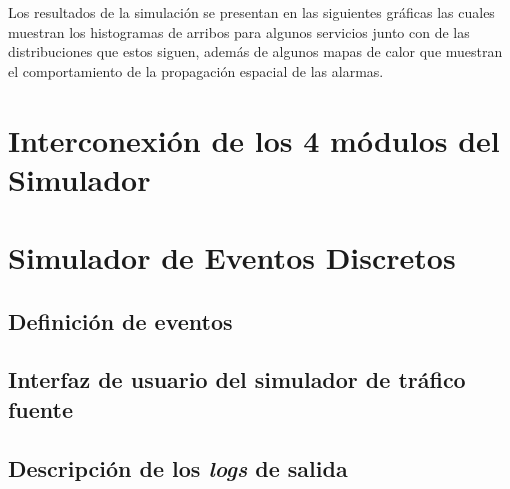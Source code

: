 Los resultados de la simulación se presentan en las siguientes gráficas las cuales muestran los histogramas de arribos para algunos servicios junto con de las distribuciones que estos siguen, además de algunos mapas de calor que muestran el comportamiento de la propagación espacial de las alarmas. \newline


\hfill

\break


\section{Interconexión de los 4 módulos del Simulador}


\hfill

\break


\section{Simulador de Eventos Discretos}

\subsection{Definición de eventos}

\subsection{Interfaz de usuario del simulador de tráfico fuente}

\subsection{Descripción de los \textit{logs} de salida}

\hfill

\break


